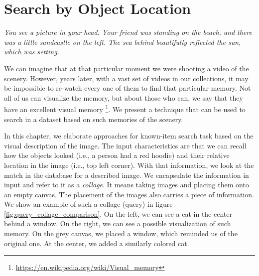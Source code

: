 \chapter{Search by Object Location}
\label{ch:object_location}



\normalem
\emph{You see a picture in your head. Your friend was standing on the beach, and there was a little sandcastle on the left. The sea behind beautifully reflected the sun, which was setting.}
\ULforem

We can imagine that at that particular moment we were shooting a video of the scenery. However, years later, with a vast set of videos in our collections, it may be impossible to re-watch every one of them to find that particular memory. Not all of us can visualize the memory, but about those who can, we say that they have an excellent visual memory \footnote{\url{https://en.wikipedia.org/wiki/Visual_memory}}. We present a technique that can be used to search in a dataset based on such memories of the scenery.

In this chapter, we elaborate approaches for known-item search task based on the visual description of the image. The input characteristics are that we can recall how the objects looked (i.e., a person had a red hoodie) and their relative location in the image (i.e., top left corner). With that information, we look at the match in the database for a described image. We encapsulate the information in input and refer to it as a \emph{collage}. It means taking images and placing them onto an empty canvas. The placement of the images also carries a piece of information. We show an example of such a collage (query) in figure \ref{fig:query_collage_comparison}. On the left, we can see a cat in the center behind a window. On the right, we can see a possible visualization of such memory. On the grey canvas, we placed a window, which reminded us of the original one. At the center, we added a similarly colored cat.


